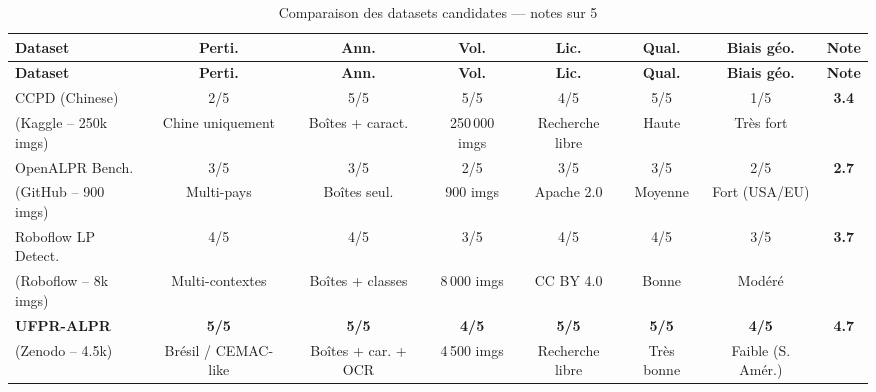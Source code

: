 \documentclass[12pt,a4paper]{article}
\begin{document}
\begin{longtable}{p{3.5cm}ccccccc}
\caption{Comparaison des datasets candidates --- notes sur 5}
\label{tab:dsd:comparatif}\\
\toprule
\textbf{Dataset} & \textbf{Perti.} & \textbf{Ann.} & \textbf{Vol.}
  & \textbf{Lic.} & \textbf{Qual.} & \textbf{Biais g\'{e}o.} & \textbf{Note} \\
\midrule
\endfirsthead
\toprule
\textbf{Dataset} & \textbf{Perti.} & \textbf{Ann.} & \textbf{Vol.}
  & \textbf{Lic.} & \textbf{Qual.} & \textbf{Biais g\'{e}o.} & \textbf{Note} \\
\midrule
\endhead
\bottomrule
\endfoot
CCPD (Chinese)
  & 2/5 & 5/5 & 5/5 & 4/5 & 5/5 & 1/5 & \textbf{3.4} \\
\small{(Kaggle -- 250k imgs)}
  & \small{Chine uniquement}
  & \small{Boîtes + caract.}
  & \small{250\,000 imgs}
  & \small{Recherche libre}
  & \small{Haute}
  & \small{Tr\`{e}s fort}
  & \\[0.3em]
OpenALPR Bench.
  & 3/5 & 3/5 & 2/5 & 3/5 & 3/5 & 2/5 & \textbf{2.7} \\
\small{(GitHub -- 900 imgs)}
  & \small{Multi-pays}
  & \small{Boîtes seul.}
  & \small{900 imgs}
  & \small{Apache 2.0}
  & \small{Moyenne}
  & \small{Fort (USA/EU)}
  & \\[0.3em]
Roboflow LP Detect.
  & 4/5 & 4/5 & 3/5 & 4/5 & 4/5 & 3/5 & \textbf{3.7} \\
\small{(Roboflow -- 8k imgs)}
  & \small{Multi-contextes}
  & \small{Boîtes + classes}
  & \small{8\,000 imgs}
  & \small{CC BY 4.0}
  & \small{Bonne}
  & \small{Mod\'{e}r\'{e}}
  & \\[0.3em]
\textbf{UFPR-ALPR}
  & \textbf{5/5} & \textbf{5/5} & \textbf{4/5} & \textbf{5/5} & \textbf{5/5} & \textbf{4/5} & \textbf{4.7} \\
\small{(Zenodo -- 4.5k)}
  & \small{Br\'{e}sil / CEMAC-like}
  & \small{Boîtes + car. + OCR}
  & \small{4\,500 imgs}
  & \small{Recherche libre}
  & \small{Tr\`{e}s bonne}
  & \small{Faible (S. Am\'{e}r.)}
  & \\
\end{longtable}
\end{document}
